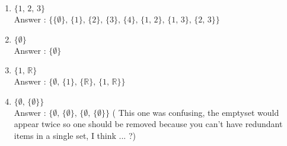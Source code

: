\documentclass[a4paper,11pt]{article}
\begin{document}
\begin{enumerate}
  \begin{enumerate}
  \item $ \lbrace 1 \text{, } 2 \text{, } 3 \rbrace$ \\
  Answer : $ \lbrace 
   \lbrace \emptyset \rbrace \text{, } 
   \lbrace 1 \rbrace \text{, } 
   \lbrace 2 \rbrace \text{, } 
   \lbrace 3 \rbrace \text{, } 
   \lbrace 4 \rbrace \text{, } 
   \lbrace 1 \text{, } 2 \rbrace \text{, } 
   \lbrace 1 \text{, } 3 \rbrace \text{, } 
   \lbrace 2 \text{, } 3 \rbrace
   \rbrace$
   \item $ \lbrace \emptyset \rbrace$ \\
   Answer : $ \lbrace\emptyset \rbrace$
   \item $ \lbrace 1 \text{, } \mathbb{R} \rbrace$ \\
   Answer : $ \lbrace
   \emptyset \text{, }
   \lbrace 1  \rbrace \text{, } 
   \lbrace \mathbb{R}  \rbrace \text{, }
   \lbrace 1 \text{, } \mathbb{R} \rbrace 
   \rbrace$
   \item $ \lbrace \emptyset \text{, } \lbrace \emptyset \rbrace \rbrace$ \\
   Answer : $ \lbrace
   \emptyset \text{, } 
   \lbrace \emptyset \rbrace \text{, } 
   \lbrace \emptyset \text{, } \lbrace \emptyset \rbrace
   \rbrace$ ( This one was confusing, the emptyset would appear twice so one should be removed because you can't have redundant items in a single set, I think ... ?)
  \end{enumerate}

\end{enumerate}
\end{document}
